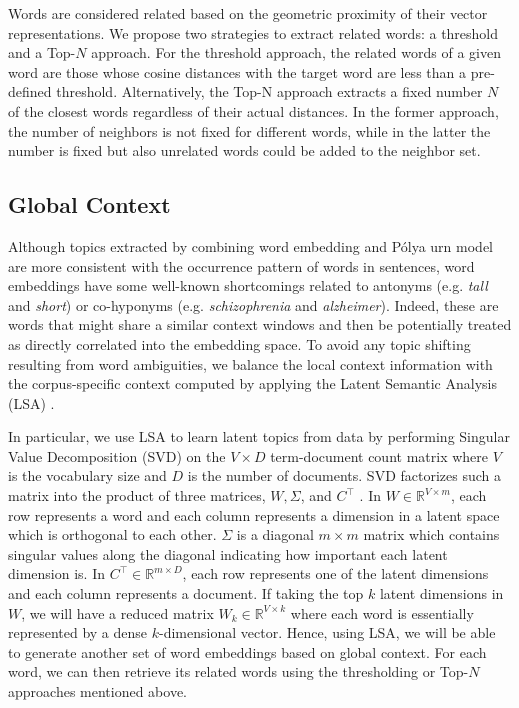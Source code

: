\documentclass[letterpaper]{article}
\begin{document}
Words are considered related based on the geometric proximity of their vector representations. We propose two strategies to extract related words: a threshold and a Top-$N$ approach. For the threshold approach, the related words of a given word are those whose cosine distances with the target word are less than a pre-defined threshold. %
Alternatively, the Top-N approach extracts a fixed number $N$ of the closest words regardless of their actual distances.
In the former approach, the number of neighbors is not fixed for different words, while in the latter the number is fixed but also unrelated words could be added to the neighbor set. %




\subsection{Global Context}

Although topics extracted by combining word embedding and P\'{o}lya urn model are more consistent with the occurrence pattern of words in sentences, word embeddings have some well-known shortcomings related to antonyms (e.g. \textit{tall} and \textit{short}) or co-hyponyms (e.g. \textit{schizophrenia} and \textit{alzheimer}). Indeed, these are words that might share a similar context windows and then be potentially treated as directly correlated into the embedding space. To avoid any topic shifting resulting from word ambiguities, %
we balance the local context information with the corpus-specific context computed by applying the Latent Semantic Analysis (LSA) \cite{Deerwester90}.

In particular, we use LSA to learn latent topics from data by performing Singular Value Decomposition (SVD) on the $V\times D$ term-document count matrix where $V$ is the vocabulary size and $D$ is the number of documents. SVD factorizes such a matrix into the product of three matrices, $W, \Sigma$, and $C^\intercal$ . In $W\in\mathbb{R}^{V\times m}$, each row represents a word and each column represents a dimension in a latent space which is orthogonal to each other. $\Sigma$ is a diagonal $m\times m$ matrix which contains singular values along the diagonal indicating how important each latent dimension is. In $C^\intercal\in\mathbb{R}^{m\times D}$, each row represents one of the latent dimensions and each column represents a document. If taking the top $k$ latent dimensions in $W$, we will have a reduced matrix $W_k\in\mathbb{R}^{V\times k}$ where each word is essentially represented by a dense $k$-dimensional vector. Hence, using LSA, we will be able to generate another set of word embeddings based on global context. For each word, we can then retrieve its related words using the thresholding or Top-$N$ approaches mentioned above.
\end{document}
